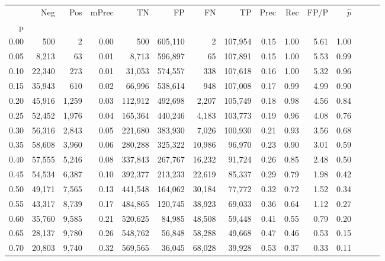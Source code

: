 \begin{tabular}{rrrrrrrrrrrrrrr}
\toprule
{} &     Neg &    Pos & mPrec &       TN &       FP &       FN &       TP &  Prec &   Rec &  FP/P & $\hat{p}$ \\
p    &         &        &       &          &          &          &          &       &       &       &           \\
\midrule
0.00 &     500 &      2 &  0.00 &      500 &  605,110 &        2 &  107,954 &  0.15 &  1.00 &  5.61 &      1.00 \\
0.05 &   8,213 &     63 &  0.01 &    8,713 &  596,897 &       65 &  107,891 &  0.15 &  1.00 &  5.53 &      0.99 \\
0.10 &  22,340 &    273 &  0.01 &   31,053 &  574,557 &      338 &  107,618 &  0.16 &  1.00 &  5.32 &      0.96 \\
0.15 &  35,943 &    610 &  0.02 &   66,996 &  538,614 &      948 &  107,008 &  0.17 &  0.99 &  4.99 &      0.90 \\
0.20 &  45,916 &  1,259 &  0.03 &  112,912 &  492,698 &    2,207 &  105,749 &  0.18 &  0.98 &  4.56 &      0.84 \\
0.25 &  52,452 &  1,976 &  0.04 &  165,364 &  440,246 &    4,183 &  103,773 &  0.19 &  0.96 &  4.08 &      0.76 \\
0.30 &  56,316 &  2,843 &  0.05 &  221,680 &  383,930 &    7,026 &  100,930 &  0.21 &  0.93 &  3.56 &      0.68 \\
0.35 &  58,608 &  3,960 &  0.06 &  280,288 &  325,322 &   10,986 &   96,970 &  0.23 &  0.90 &  3.01 &      0.59 \\
0.40 &  57,555 &  5,246 &  0.08 &  337,843 &  267,767 &   16,232 &   91,724 &  0.26 &  0.85 &  2.48 &      0.50 \\
0.45 &  54,534 &  6,387 &  0.10 &  392,377 &  213,233 &   22,619 &   85,337 &  0.29 &  0.79 &  1.98 &      0.42 \\
0.50 &  49,171 &  7,565 &  0.13 &  441,548 &  164,062 &   30,184 &   77,772 &  0.32 &  0.72 &  1.52 &      0.34 \\
0.55 &  43,317 &  8,739 &  0.17 &  484,865 &  120,745 &   38,923 &   69,033 &  0.36 &  0.64 &  1.12 &      0.27 \\
0.60 &  35,760 &  9,585 &  0.21 &  520,625 &   84,985 &   48,508 &   59,448 &  0.41 &  0.55 &  0.79 &      0.20 \\
0.65 &  28,137 &  9,780 &  0.26 &  548,762 &   56,848 &   58,288 &   49,668 &  0.47 &  0.46 &  0.53 &      0.15 \\
0.70 &  20,803 &  9,740 &  0.32 &  569,565 &   36,045 &   68,028 &   39,928 &  0.53 &  0.37 &  0.33 &      0.11 \\

\end{tabular}

